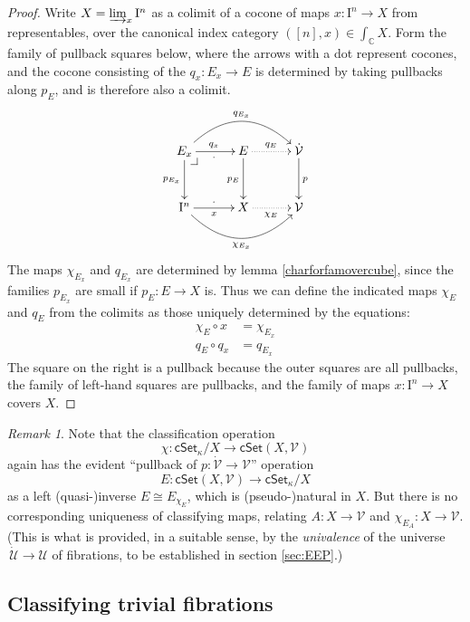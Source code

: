 \documentclass[12pt]{article}
\makeatletter
\newcommand{\C}{\ensuremath{\mathbb{C}}}
\newcommand{\cSet}{\ensuremath{\mathsf{cSet}}}
\newcommand{\pbcorner}[1][dr]{\save*!/#1-1.2pc/#1:(-1,1)@^{|-}\restore}
\newcommand{\ra}{\ensuremath{\rightarrow}}
\newcommand{\I}{\ensuremath{\mathrm{I}}}
\newcommand{\U}{\ensuremath{\mathcal{U}}}
\newcommand{\UU}{\ensuremath{\,\dot{\mathcal{U}}}}
\newcommand{\V}{\ensuremath{\mathcal{V}}}
\newcommand{\VV}{\ensuremath{\dot{\mathcal{V}}}}
\theoremstyle{remark}
\newtheorem{remark}[theorem]{Remark}
\theoremstyle{definition}
\makeatother
\begin{document}
\begin{proof}
Write $X = \varinjlim_{x} \I^n$ as a colimit of a cocone of maps $ x : \I^n \ra X$ from representables, over the canonical index category $([n],x) \in \int_\C X$.  Form the family of pullback squares below, where the arrows with a dot represent cocones, and the cocone consisting of the $q_x : E_x \ra E$  is determined by taking pullbacks along $p_E$, and is therefore also a colimit. 
\begin{equation}\label{diagram:U7}
\xymatrix@=3em{
E_x \ar[d]_{p_{E_x}} \ar[r]_{\cdot}^{q_x} \ar@/^2.0pc/[rr]^{q_{E_x}} \pbcorner & E \ar[d]_{p_{E}} \ar@{..>}[r]^{q_E} & \VV\ar[d]^{p}  \\
\I^n \ar@/_2.0pc/[rr]_{\chi_{E_x}}  \ar[r]^{\cdot}_x & X \ar@{..>}[r]_{\chi_E} & \V
}
\end{equation}
The maps $\chi_{E_x}$  and $q_{E_x}$ are determined by lemma \ref{charforfamovercube}, since the families $p_{E_x}$ are small if $p_E: E \ra X$ is.  Thus we can define the indicated maps $\chi_E$ and $q_E$ from the colimits as those uniquely determined by the equations:
\begin{align}\label{eqns:U}
\chi_E \circ x &= \chi_{E_x}\\
q_E \circ q_{x} &= q_{E_x}
\end{align}
The square on the right is a pullback because the outer squares are all pullbacks,  the family of left-hand squares are pullbacks, and the family of maps $x : \I^n \ra X$ covers $X$.
\end{proof}

\begin{remark} 
Note that the classification operation $$\chi : \cSet_\kappa/X \ra \cSet(X, \V)$$ again has the evident ``pullback of $p : \VV\ra\V$'' operation 
$$E : \cSet(X, \V) \ra \cSet_\kappa/X $$ as a left (quasi-)inverse $
E \cong E_{\chi_E}$, which is (pseudo-)natural in $X$. 
But there is no corresponding uniqueness of classifying maps, relating $A : X\ra \V$ and $\chi_{E_A} : X\ra\V$.  (This is what is provided, in a suitable sense, by the \emph{univalence} of the universe $\UU\ra\U$ of fibrations, to be established in section \ref{sec:EEP}.)
\end{remark}

\subsection{Classifying trivial fibrations}
\end{document}
